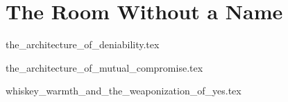 \section{The Room Without a Name}


{the_architecture_of_deniability.tex}

{the_architecture_of_mutual_compromise.tex}

{whiskey_warmth_and_the_weaponization_of_yes.tex}